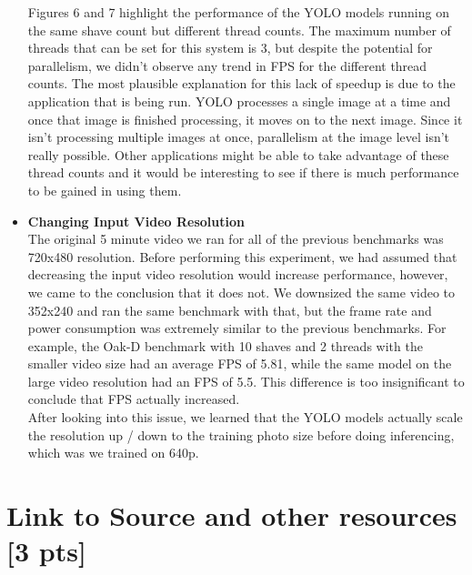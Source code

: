 \documentclass[sigconf,authorversion,nonacm]{acmart}
\begin{document}
\begin{itemize}
    Figures 6 and 7 highlight the performance of the YOLO models running on the same shave count but different thread counts. The maximum number of threads that can be set for this system is 3, but despite the potential for parallelism, we didn’t observe any trend in FPS for the different thread counts. The most plausible explanation for this lack of speedup is due to the application that is being run. YOLO processes a single image at a time and once that image is finished processing, it moves on to the next image. Since it isn’t processing multiple images at once, parallelism at the image level isn’t really possible. Other applications might be able to take advantage of these thread counts and it would be interesting to see if there is much performance to be gained in using them.
    

    \item \textbf{Changing Input Video Resolution} \\
    The original 5 minute video we ran for all of the previous benchmarks was 720x480 resolution. Before performing this experiment, we had assumed that decreasing the input video resolution would increase performance, however, we came to the conclusion that it does not. We downsized the same video to 352x240 and ran the same benchmark with that, but the frame rate and power consumption was extremely similar to the previous benchmarks. For example, the Oak-D benchmark with 10 shaves and 2 threads with the smaller video size had an average FPS of 5.81, while the same model on the large video resolution had an FPS of 5.5. This difference is too insignificant to conclude that FPS actually increased.\\ After looking into this issue, we learned that the YOLO models actually scale the resolution up / down to the training photo size before doing inferencing, which was we trained on 640p.
\end{itemize}

\section{Link to Source and other resources {\small {[3 pts]}}} 
\end{document}

